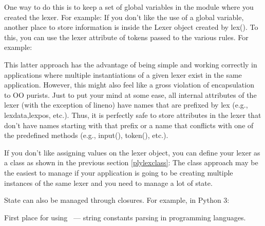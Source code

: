 One way to do this is to keep a set of global variables in the module where you
created the lexer. For example:
If you don't like the use of a global variable, another place to store
information is inside the Lexer object created by lex(). To this, you can use
the lexer attribute of tokens passed to the various rules. For example:

This latter approach has the advantage of being simple and working correctly in
applications where multiple instantiations of a given lexer exist in the same
application. However, this might also feel like a gross violation of
encapsulation to OO purists. Just to put your mind at some ease, all internal
attributes of the lexer (with the exception of lineno) have names that are
prefixed by lex (e.g., lexdata,lexpos, etc.). Thus, it is perfectly safe to
store attributes in the lexer that don't have names starting with that prefix or
a name that conflicts with one of the predefined methods (e.g., input(),
token(), etc.).

If you don't like assigning values on the lexer object, you can define your
lexer as a class as shown in the previous section \ref{plylexclass}:
The class approach may be the easiest to manage if your application is going to
be creating multiple instances of the same lexer and you need to manage a lot of
state.

State can also be managed through closures. For example, in Python 3:


First place for using \ --- string constants parsing in
programming languages.

\secup
